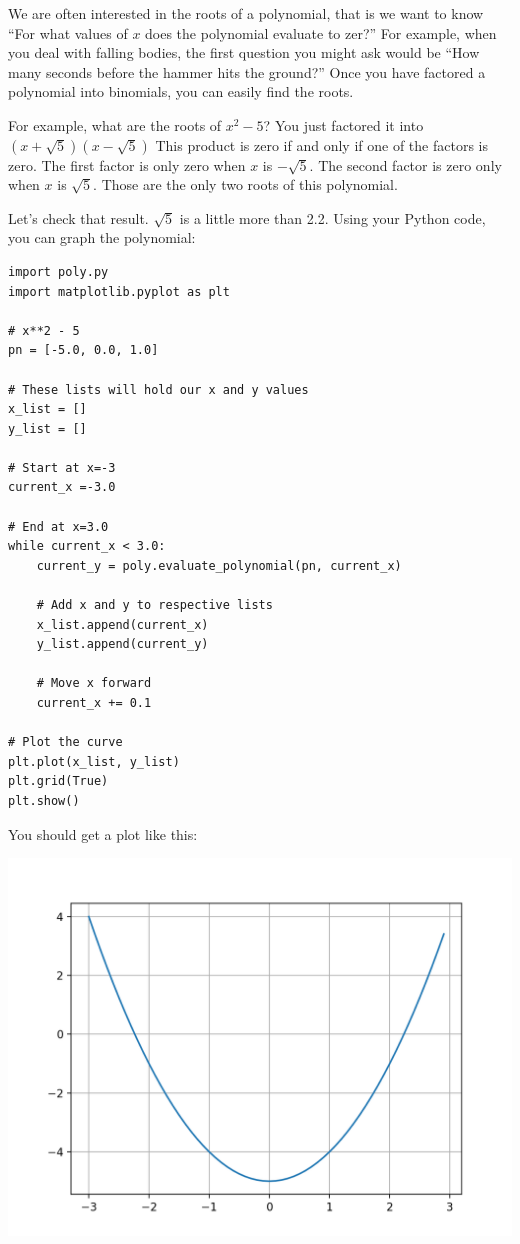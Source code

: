 We are often interested in the roots of a polynomial, that is we want
to know ``For what values of $x$ does the polynomial evaluate to
zer?'' For example, when you deal with falling bodies, the first
question you might ask would be ``How many seconds before the hammer
hits the ground?''  Once you have factored a polynomial into
binomials, you can easily find the roots.

For example, what are the roots of $x^2 - 5$? You just factored it
into $(x + \sqrt{5})(x - \sqrt{5})$ This product is zero if and only
if one of the factors is zero. The first factor is only zero when $x$
is $-\sqrt{5}$. The second factor is zero only when $x$ is
$\sqrt{5}$. Those are the only two roots of this
polynomial.

Let's check that result. $\sqrt{5}$ is a little more than 2.2.  Using
your Python code, you can graph the polynomial:
\begin{Verbatim}
import poly.py
import matplotlib.pyplot as plt

# x**2 - 5
pn = [-5.0, 0.0, 1.0]

# These lists will hold our x and y values
x_list = []
y_list = []

# Start at x=-3
current_x =-3.0

# End at x=3.0
while current_x < 3.0:
    current_y = poly.evaluate_polynomial(pn, current_x)

    # Add x and y to respective lists
    x_list.append(current_x)
    y_list.append(current_y)

    # Move x forward
    current_x += 0.1

# Plot the curve
plt.plot(x_list, y_list)
plt.grid(True)
plt.show()
\end{Verbatim}

You should get a plot like this:

\includegraphics[width=\textwidth]{sqrt5.png}

